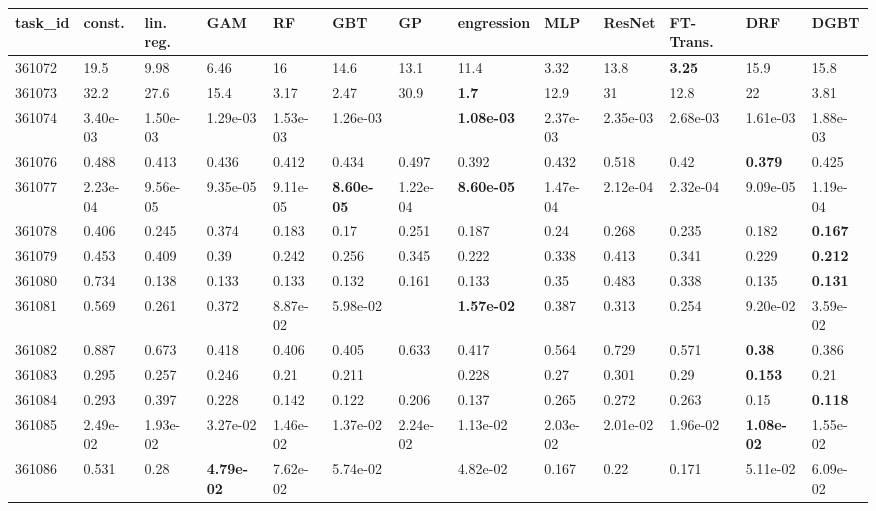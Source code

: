 \begin{table}[ht!]
\centering
\begingroup\footnotesize
\begin{tabular}{lllllllllllll}
  \hline
\hline
task\_id & const. & lin. reg. & GAM & RF & GBT & GP & engression & MLP & ResNet & FT-Trans. & DRF & DGBT \\ 
  \hline
361072 & 19.5 & 9.98 & 6.46 & 16 & 14.6 & 13.1 & 11.4 & 3.32 & 13.8 & \textbf{3.25} & 15.9 & 15.8 \\ 
  361073 & 32.2 & 27.6 & 15.4 & 3.17 & 2.47 & 30.9 & \textbf{1.7} & 12.9 & 31 & 12.8 & 22 & 3.81 \\ 
  361074 & 3.40e-03 & 1.50e-03 & 1.29e-03 & 1.53e-03 & 1.26e-03 &  & \textbf{1.08e-03} & 2.37e-03 & 2.35e-03 & 2.68e-03 & 1.61e-03 & 1.88e-03 \\ 
  361076 & 0.488 & 0.413 & 0.436 & 0.412 & 0.434 & 0.497 & 0.392 & 0.432 & 0.518 & 0.42 & \textbf{0.379} & 0.425 \\ 
  361077 & 2.23e-04 & 9.56e-05 & 9.35e-05 & 9.11e-05 & \textbf{8.60e-05} & 1.22e-04 & \textbf{8.60e-05} & 1.47e-04 & 2.12e-04 & 2.32e-04 & 9.09e-05 & 1.19e-04 \\ 
  361078 & 0.406 & 0.245 & 0.374 & 0.183 & 0.17 & 0.251 & 0.187 & 0.24 & 0.268 & 0.235 & 0.182 & \textbf{0.167} \\ 
  361079 & 0.453 & 0.409 & 0.39 & 0.242 & 0.256 & 0.345 & 0.222 & 0.338 & 0.413 & 0.341 & 0.229 & \textbf{0.212} \\ 
  361080 & 0.734 & 0.138 & 0.133 & 0.133 & 0.132 & 0.161 & 0.133 & 0.35 & 0.483 & 0.338 & 0.135 & \textbf{0.131} \\ 
  361081 & 0.569 & 0.261 & 0.372 & 8.87e-02 & 5.98e-02 &  & \textbf{1.57e-02} & 0.387 & 0.313 & 0.254 & 9.20e-02 & 3.59e-02 \\ 
  361082 & 0.887 & 0.673 & 0.418 & 0.406 & 0.405 & 0.633 & 0.417 & 0.564 & 0.729 & 0.571 & \textbf{0.38} & 0.386 \\ 
  361083 & 0.295 & 0.257 & 0.246 & 0.21 & 0.211 &  & 0.228 & 0.27 & 0.301 & 0.29 & \textbf{0.153} & 0.21 \\ 
  361084 & 0.293 & 0.397 & 0.228 & 0.142 & 0.122 & 0.206 & 0.137 & 0.265 & 0.272 & 0.263 & 0.15 & \textbf{0.118} \\ 
  361085 & 2.49e-02 & 1.93e-02 & 3.27e-02 & 1.46e-02 & 1.37e-02 & 2.24e-02 & 1.13e-02 & 2.03e-02 & 2.01e-02 & 1.96e-02 & \textbf{1.08e-02} & 1.55e-02 \\ 
  361086 & 0.531 & 0.28 & \textbf{4.79e-02} & 7.62e-02 & 5.74e-02 &  & 4.82e-02 & 0.167 & 0.22 & 0.171 & 5.11e-02 & 6.09e-02 \\ 

\end{tabular}
\end{table}
